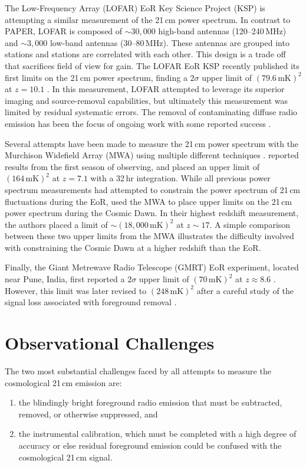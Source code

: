\begin{bibunit}
The Low-Frequency Array (LOFAR) EoR Key Science Project (KSP) is attempting a similar measurement of
the 21\,cm power spectrum. In contrast to PAPER, LOFAR is composed of $\sim30,000$ high-band
antennas (120--240\,MHz) and $\sim3,000$ low-band antennas (30--80\,MHz). These antennas are grouped
into stations and stations are correlated with each other. This design is a trade off that
sacrifices field of view for gain. The LOFAR EoR KSP recently published its first limits on the
21\,cm power spectrum, finding a $2\sigma$ upper limit of $(79.6\,\text{mK})^2$ at $z=10.1$
\citep{2017ApJ...838...65P}. In this measurement, LOFAR attempted to leverage its superior imaging
and source-removal capabilities, but ultimately this measurement was limited by residual systematic
errors. The removal of contaminating diffuse radio emission has been the focus of ongoing work with
some reported success \citep{koopmans_2017}.

Several attempts have been made to measure the 21\,cm power spectrum with the Murchison Widefield
Array (MWA) using multiple different techniques \citep{2016ApJ...825..114J}.
\citet{2016ApJ...833..102B} reported results from the first season of observing, and placed an upper
limit of $(164\,\text{mK})^2$ at $z=7.1$ with a 32\,hr integration.  While all previous power
spectrum measurements had attempted to constrain the power spectrum of 21\,cm fluctuations during
the EoR, \citet{2016MNRAS.460.4320E} used the MWA to place upper limits on the 21\,cm power spectrum
during the Cosmic Dawn.  In their highest redshift measurement, the authors placed a limit of $\sim
(18,000\,\text{mK})^2$ at $z\sim 17$. A simple comparison between these two upper limits from the
MWA illustrates the difficulty involved with constraining the Cosmic Dawn at a higher redshift than
the EoR.

Finally, the Giant Metrewave Radio Telescope (GMRT) EoR experiment, located near Pune, India, first
reported a $2\sigma$ upper limit of $(70\,\text{mK})^2$ at $z \approx 8.6$
\citep{2011MNRAS.413.1174P}.  However, this limit was later revised to $(248\,\text{mK})^2$ after a
careful study of the signal loss associated with foreground removal \citep{2013MNRAS.433..639P}.

\section{Observational Challenges}

The two most substantial challenges faced by all attempts to measure the cosmological 21\,cm
emission are:
\begin{enumerate}
    \item
        the blindingly bright foreground radio emission that must be subtracted, removed, or
        otherwise suppressed, and
    \item
        the instrumental calibration, which must be completed with a high degree of accuracy or else
        residual foreground emission could be confused with the cosmological 21\,cm signal.
\end{enumerate}


\end{bibunit}
